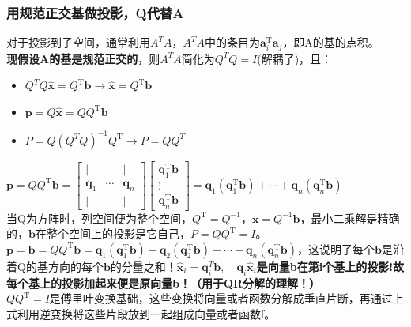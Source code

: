 \documentclass[UTF8]{article}
\begin{document}
    \subsubsection{用规范正交基做投影，Q代替A}
    对于投影到子空间，通常利用$A^T A$，$A^T A$中的条目为$\boldsymbol{a}_{i}^{\mathrm{T}} \boldsymbol{a}_{j}$，即A的基的点积。\\
    \textbf{现假设A的基是规范正交的}，则$A^T A$简化为$Q^T Q=I$(解耦了)，且：
    \begin{itemize}
        \item $Q^T Q\widehat{\boldsymbol{x}}=Q^{\mathrm{T}} \boldsymbol{b} \rightarrow \widehat{\boldsymbol{x}}=Q^{\mathrm{T}} \boldsymbol{b}$
        \item $\bm{p}=Q \widehat{\bm{x}} = Q Q^{\mathrm{T}} \bm{b}$
        \item $P=Q(Q^T Q)^{-1}Q^{\mathrm{T}} \rightarrow P=Q Q^T$
    \end{itemize}
    $\boldsymbol{p}=Q Q^{\mathrm{T}} \bm{b}=\left[\begin{array}{lll}{|} & {} & { |} \\ {\bm{q}_{1}} & {\cdots} & {\bm{q}_{n}} \\ { |} & {} & { |}\end{array}\right]\left[\begin{array}{c}{\bm{q}_{1}^{\mathrm{T}} \bm{b}} \\ {\vdots} \\ {\bm{q}_{n}^{\mathrm{T}} \bm{b}}\end{array}\right]=\boldsymbol{q}_{1}\left(\boldsymbol{q}_{1}^{\mathrm{T}} \boldsymbol{b}\right)+\cdots+\boldsymbol{q}_{n}\left(\boldsymbol{q}_{n}^{\mathrm{T}} \boldsymbol{b}\right)$
    \\
    当Q为方阵时，列空间便为整个空间，$Q^{\mathrm{T}}=Q^{-1}$，$\boldsymbol{x}=Q^{-1} \boldsymbol{b}$，最小二乘解是精确的，$\bm{b}$在整个空间上的投影是它自己，$P=Q Q^{\mathrm{T}}=I$。
    \\
    $\boldsymbol{p}=\boldsymbol{b}=Q Q^{\mathrm{T}} \bm{b}=\bm{q}_{1}\left(\bm{q}_{1}^{\mathrm{T}} \bm{b}\right)+\bm{q}_{2}\left(\bm{q}_{2}^{\mathrm{T}} \bm{b}\right)+\cdots+\bm{q}_{n}\left(\bm{q}_{n}^{\mathrm{T}} \bm{b}\right)$，这说明了每个$\bm{b}$是沿着Q的基方向的每个$\bm{b}$的分量之和！$\widehat{\bm{x}}_i = \bm{q}^T_{i} \bm{b}, \quad \bm{q}_i \widehat{\bm{x}}_i$\textbf{是向量b在第i个基上的投影!故每个基上的投影加起来便是原向量b！（用于QR分解的理解！）}
    \\
    $Q Q^{\mathrm{T}}=I$是傅里叶变换基础，这些变换将向量或者函数分解成垂直片断，再通过上式利用逆变换将这些片段放到一起组成向量或者函数f。
\end{document}
